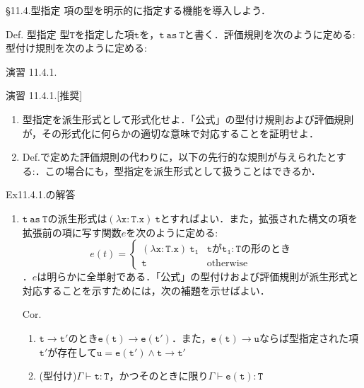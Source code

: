\documentclass[9pt]{beamer}
\begin{document}
\begin{frame}{\S11.4.型指定}
項の型を明示的に指定する機能を導入しよう．\begin{alertblock}{Def. 型指定}
型$\mathtt{T}$を指定した項$\mathtt{t}$を，$\mathtt{t\ as\ T}$と書く．評価規則を次のように定める:
型付け規則を次のように定める:
\end{alertblock}
\end{frame}
\begin{frame}{演習 11.4.1.}
\begin{alertblock}{演習 11.4.1.[推奨]}
\begin{enumerate}
\item 型指定を派生形式として形式化せよ．「公式」の型付け規則および評価規則が，その形式化に何らかの適切な意味で対応することを証明せよ．
\item Def.で定めた評価規則の代わりに，以下の先行的な規則が与えられたとする:．この場合にも，型指定を派生形式として扱うことはできるか．
\end{enumerate}
\end{alertblock}
\end{frame}
\begin{frame}{Ex11.4.1.の解答}
\begin{enumerate}
\item $\mathtt{t\ as\ T}$の派生形式は$\mathtt{(\lambda x:T.x)\ t}$とすればよい．また，拡張された構文の項を拡張前の項に写す関数$e$を次のように定める:
\begin{equation*}e(t) = \begin{cases}
\mathtt{(\lambda x:T. x)\ t_{1}}& \text{$\mathtt{t}$が$\mathtt{t_{1}:T}$の形のとき} \\
\mathtt{t} & \text{otherwise}
\end{cases}\end{equation*}．$e$は明らかに全単射である．「公式」の型付けおよび評価規則が派生形式と対応することを示すためには，次の補題を示せばよい．
\begin{alertblock}{Cor.}\begin{enumerate}
\item $\mathtt{t\longrightarrow t'}$のとき$\mathtt{e(t)\longrightarrow e(t')}$．また，$\mathtt{e(t)\longrightarrow u}$ならば型指定された項$\mathtt{t'}$が存在して$\mathtt{u = e(t')\land t\longrightarrow t'}$
\item (型付け)$\Gamma\vdash\mathtt{t:T}$，かつそのときに限り$\Gamma\vdash \mathtt{e(t):T}$
\end{enumerate}
\end{alertblock}
\end{enumerate}
\end{frame}
\end{document}
